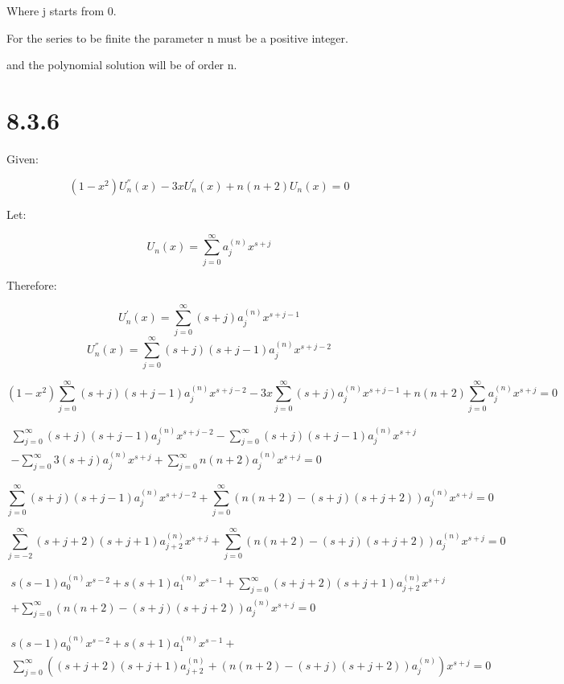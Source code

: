 \documentclass[12pt]{article}
\begin{document}
Where j starts from 0.

For the series to be finite the parameter n must be a positive integer.

and the polynomial solution will be of order n.

\newpage
\section{8.3.6}

Given:

\[(1-x^2) U^{''}_n(x) - 3x U^{'}_n(x) + n(n+2) U_n(x) = 0\]

Let:

\[U_n(x)=\sum_{j = 0}^{\infty} {a_j^{(n)} x^{s+j}} \]

Therefore:

\[U^{'}_n(x)=\sum_{j = 0}^{\infty} (s+j)a_j^{(n)} x^{s+j-1} \]
\[U^{''}_n(x)=\sum_{j = 0}^{\infty} (s+j)(s+j-1)a_j^{(n)} x^{s+j-2} \]

\[(1-x^2) \sum_{j = 0}^{\infty} (s+j)(s+j-1)a_j^{(n)} x^{s+j-2} - 3x \sum_{j = 0}^{\infty} (s+j)a_j^{(n)} x^{s+j-1} + n(n+2) \sum_{j = 0}^{\infty} a_j^{(n)} x^{s+j} = 0\]

\begin{multline*}
    \sum_{j = 0}^{\infty} (s+j)(s+j-1)a_j^{(n)} x^{s+j-2} - \sum_{j = 0}^{\infty} (s+j)(s+j-1)a_j^{(n)} x^{s+j} \\
    - \sum_{j = 0}^{\infty} 3(s+j)a_j^{(n)} x^{s+j} + \sum_{j = 0}^{\infty} n(n+2) a_j^{(n)} x^{s+j} = 0
\end{multline*}

\[
    \sum_{j = 0}^{\infty} (s+j)(s+j-1)a_j^{(n)} x^{s+j-2}
    + \sum_{j = 0}^{\infty} \left(n(n+2)  - (s+j)(s+j+2)\right)a_j^{(n)} x^{s+j} = 0
\]

\[
    \sum_{j = -2}^{\infty} (s+j+2)(s+j+1)a_{j + 2}^{(n)} x^{s+j}
    + \sum_{j = 0}^{\infty} \left(n(n+2)  - (s+j)(s+j+2)\right)a_j^{(n)} x^{s+j} = 0
\]

\begin{multline*}
    s(s-1) a_0^{(n)} x^{s-2} + s(s+1) a_1^{(n)} x^{s-1}
    + \sum_{j = 0}^{\infty} (s+j+2)(s+j+1)a_{j+2}^{(n)} x^{s+j} \\
    + \sum_{j = 0}^{\infty} \left(n(n+2)  - (s+j)(s+j+2)\right)a_j^{(n)} x^{s+j} = 0
\end{multline*}

\begin{multline*}
    s(s-1) a_0^{(n)} x^{s-2} + s(s+1) a_1^{(n)} x^{s-1} + \\
    \sum_{j = 0}^{\infty} \left((s+j+2)(s+j+1)a_{j+2}^{(n)}
    + \left(n(n+2)  - (s+j)(s+j+2)\right)a_j^{(n)}\right) x^{s+j} = 0
\end{multline*}
\end{document}
